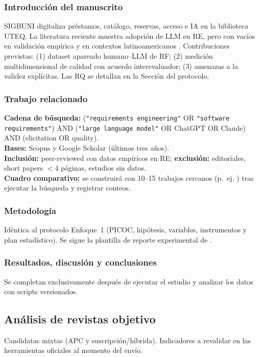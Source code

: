 \documentclass[12pt,journal,onecolumn]{IEEEtran}
\begin{document}
\subsubsection{Introducción del manuscrito}
SIGBUNI digitaliza préstamos, catálogo, reservas, acceso e IA en la biblioteca UTEQ. La literatura reciente muestra adopción de LLM en RE, pero con vacíos en validación empírica y en contextos latinoamericanos \cite{cheng2026genai,vogelsang2024llm}. Contribuciones previstas: (1) dataset apareado humano--LLM de RF; (2) medición multidimensional de calidad con acuerdo interevaluador; (3) amenazas a la validez explícitas. Las RQ se detallan en la Sección del protocolo.

\subsubsection{Trabajo relacionado}
\textbf{Cadena de búsqueda:} (\texttt{"requirements engineering"} OR \texttt{"software requirements"}) AND (\texttt{"large language model"} OR ChatGPT OR Claude) AND (elicitation OR quality).\\
\textbf{Bases:} Scopus y Google Scholar (últimos tres años).\\
\textbf{Inclusión:} peer-reviewed con datos empíricos en RE; \textbf{exclusión:} editoriales, short papers $<$4 páginas, estudios sin datos.\\
\textbf{Cuadro comparativo:} se construirá con 10--15 trabajos cercanos (p.~ej. \cite{cheng2026genai,montgomery2022quality,ferrari2016ambiguity,fischbach2023acceptance}) tras ejecutar la búsqueda y registrar conteos.

\subsubsection{Metodología}
Idéntica al protocolo Enfoque~1 (PICOC, hipótesis, variables, instrumentos y plan estadístico). Se sigue la plantilla de reporte experimental de \cite{jedlitschka2008reporting,wohlin2012experimentation}.

\subsubsection{Resultados, discusión y conclusiones}
Se completan exclusivamente después de ejecutar el estudio y analizar los datos con scripts versionados.

\subsection{Análisis de revistas objetivo}
Candidatas mixtas (APC y suscripción/híbrida). Indicadores a revalidar en las herramientas oficiales al momento del envío.
\end{document}
